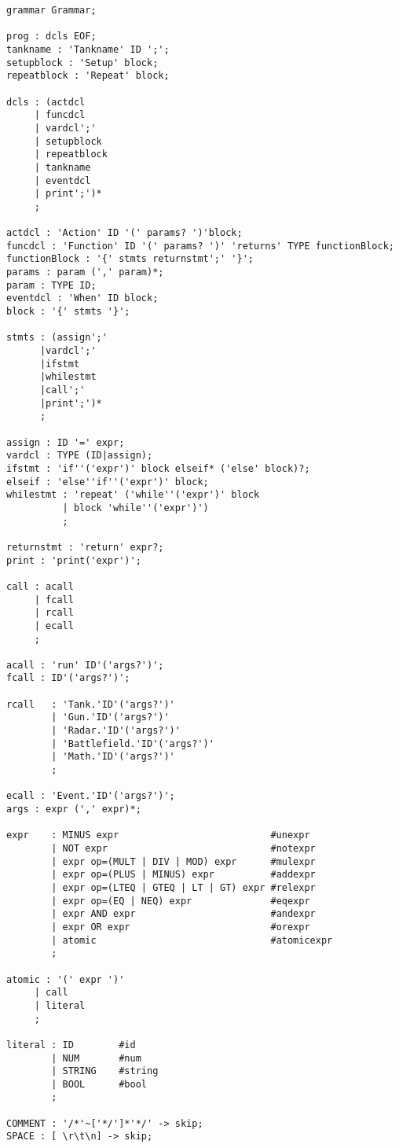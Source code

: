 \begin{lstlisting}[label={lst:CFG}]
grammar Grammar;

prog : dcls EOF;
tankname : 'Tankname' ID ';';
setupblock : 'Setup' block;
repeatblock : 'Repeat' block;

dcls : (actdcl
     | funcdcl
     | vardcl';'
     | setupblock
     | repeatblock
     | tankname
     | eventdcl
     | print';')*
     ;

actdcl : 'Action' ID '(' params? ')'block;
funcdcl : 'Function' ID '(' params? ')' 'returns' TYPE functionBlock;
functionBlock : '{' stmts returnstmt';' '}';
params : param (',' param)*;
param : TYPE ID;
eventdcl : 'When' ID block;
block : '{' stmts '}';

stmts : (assign';'
      |vardcl';'
      |ifstmt
      |whilestmt
      |call';'
      |print';')*
      ;

assign : ID '=' expr;
vardcl : TYPE (ID|assign);
ifstmt : 'if''('expr')' block elseif* ('else' block)?;
elseif : 'else''if''('expr')' block;
whilestmt : 'repeat' ('while''('expr')' block
          | block 'while''('expr')')
          ;

returnstmt : 'return' expr?;
print : 'print('expr')';

call : acall
     | fcall
     | rcall
     | ecall
     ;

acall : 'run' ID'('args?')';
fcall : ID'('args?')';

rcall   : 'Tank.'ID'('args?')'
        | 'Gun.'ID'('args?')'
        | 'Radar.'ID'('args?')'
        | 'Battlefield.'ID'('args?')'
        | 'Math.'ID'('args?')'
        ;

ecall : 'Event.'ID'('args?')';
args : expr (',' expr)*;

expr    : MINUS expr                           #unexpr
        | NOT expr                             #notexpr
        | expr op=(MULT | DIV | MOD) expr      #mulexpr
        | expr op=(PLUS | MINUS) expr          #addexpr
        | expr op=(LTEQ | GTEQ | LT | GT) expr #relexpr
        | expr op=(EQ | NEQ) expr              #eqexpr
        | expr AND expr                        #andexpr
        | expr OR expr                         #orexpr
        | atomic                               #atomicexpr
        ;

atomic : '(' expr ')'
     | call
     | literal
     ;

literal : ID        #id
        | NUM       #num
        | STRING    #string
        | BOOL      #bool
        ;

COMMENT : '/*'~['*/']*'*/' -> skip;
SPACE : [ \r\t\n] -> skip;

\end{lstlisting}


